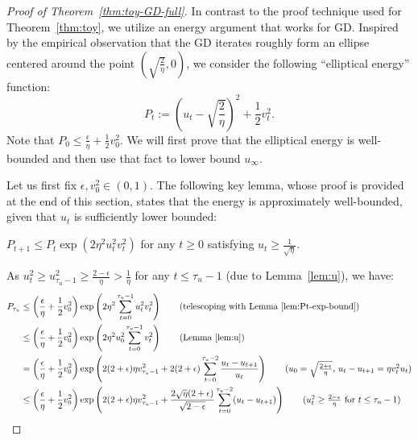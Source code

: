 \begin{proof}[Proof of Theorem~\ref{thm:toy-GD-full}]
    In contrast to the proof technique used for Theorem~\ref{thm:toy}, we utilize an energy argument that works for GD. 
    Inspired by the empirical observation that the GD iterates roughly form an ellipse centered around the point $\left( \sqrt{\frac{2}{\eta}}, 0 \right)$, we consider the following ``elliptical energy'' function:
    \begin{equation}
        P_t := \left( u_t - \sqrt{\frac{2}{\eta}} \right)^2 + \frac{1}{2} v_t^2.
    \end{equation}
    Note that $P_0 \leq \frac{\epsilon}{\eta} + \frac{1}{2} v_0^2$.
    We will first prove that the elliptical energy is well-bounded and then use that fact to lower bound $u_\infty$.

    Let us first fix $\epsilon, v_0^2 \in (0, 1)$.
    The following key lemma, whose proof is provided at the end of this section, states that the energy is approximately well-bounded, given that $u_t$ is sufficiently lower bounded:
    \begin{lemma}
    \label{lem:Pt-exp-bound}
        $P_{t+1} \leq P_t \exp\left( 2\eta^2 u_t^2 v_t^2 \right)$ for any $t \geq 0$ satisfying $u_t \ge \frac{1}{\sqrt{\eta}}$.
    \end{lemma}
    As $u_t^2 \geq u_{\tau_u-1}^2 \ge \frac{2-\epsilon}{\eta} > \frac{1}{\eta}$ for any $t \leq \tau_u - 1$ (due to Lemma~\ref{lem:u}), we have:
    \begin{align*}
        P_{\tau_u} &\leq \left( \frac{\epsilon}{\eta} + \frac{1}{2} v_0^2 \right) \exp\left( 2\eta^2 \sum_{t = 0}^{\tau_u - 1} u_t^2 v_t^2 \right) \tag{telescoping with Lemma~\ref{lem:Pt-exp-bound}} \\
        &\leq \left( \frac{\epsilon}{\eta} + \frac{1}{2} v_0^2 \right) \exp\left( 2\eta^2 u_0^2 \sum_{t = 0}^{\tau_u - 1} v_t^2 \right) \tag{Lemma~\ref{lem:u}} \\
        &= \left( \frac{\epsilon}{\eta} + \frac{1}{2} v_0^2 \right) \exp\left( 2(2 + \epsilon)\eta v_{\tau_u - 1}^2 + 2(2 + \epsilon) \sum_{t = 0}^{\tau_u - 2} \frac{u_t - u_{t+1}}{u_t} \right) \tag{$u_0 = \sqrt{\frac{2 + \epsilon}{\eta}}$, $u_t - u_{t+1} = \eta v_t^2 u_t$} \\
        &\leq \left( \frac{\epsilon}{\eta} + \frac{1}{2} v_0^2 \right) \exp\left( 2(2 + \epsilon)\eta v_{\tau_u - 1}^2 +  \frac{2 \sqrt{\eta} (2 + \epsilon)}{\sqrt{2 - \epsilon}} \sum_{t = 0}^{\tau_u - 2} (u_t - u_{t+1}) \right) \tag{$u_t^2 \geq \frac{2 - \epsilon}{\eta}$ for $t \leq \tau_u - 1$} \\

\end{align*}
\end{proof}
